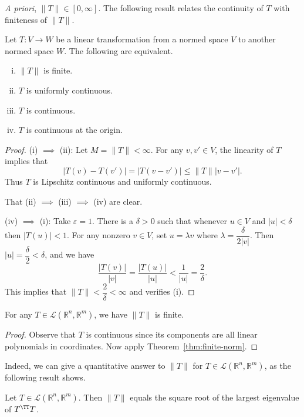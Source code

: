 \documentclass[11pt]{article}
\begin{document}
\textit{A priori}, $\| T \| \in [0, \infty]$.
The following result relates the continuity of $T$ with finiteness of $\| T \|$.

\begin{thm}
  \label{thm:finite-norm}
  Let $T : V \to W$ be a linear transformation from a normed space $V$ to another normed space $W$.
  The following are equivalent.
  \begin{enumerate}[(i)]
    \item $\| T \|$ is finite.
    \item $T$ is uniformly continuous.
    \item $T$ is continuous.
    \item $T$ is continuous at the origin.
  \end{enumerate}
\end{thm}

\begin{proof}
  (i) $\implies$ (ii): Let $M = \| T \| < \infty$.
  For any $v, v' \in V$, the linearity of $T$ implies that
  \[
    | T(v) - T(v') | = | T (v-v') | \leqslant \| T \| |v - v'|.
  \]
  Thus $T$ is Lipschitz continuous and uniformly continuous.

  That (ii) $\implies$ (iii) $\implies$ (iv) are clear.

  (iv) $\implies$ (i): Take $\varepsilon = 1$.
  There is a $\delta > 0$ such that whenever $u \in V$ and $|u| < \delta$ then $|T(u)| < 1$.
  For any nonzero $v \in V$, set $u = \lambda v$ where $\lambda = \dfrac{\delta}{2 |v|}$.
  Then $|u| = \dfrac{\delta}{2} < \delta$, and we have
  \[
    \frac{ |T(v)| }{ |v| } = \frac{ |T(u)| }{ |u| } < \frac{1}{|u|} = \frac{2}{\delta}.
  \]
  This implies that $\| T \| < \dfrac{2}{\delta} < \infty$ and verifies (i).
\end{proof}

\begin{cor}
  For any $T \in \mathcal{L}(\mathbb{R}^n, \mathbb{R}^m)$, we have $\| T \|$ is finite.
\end{cor}

\begin{proof}
  Observe that $T$ is continuous since its components are all linear polynomials in coordinates.
  Now apply Theorem~\ref{thm:finite-norm}.
\end{proof}

Indeed, we can give a quantitative answer to $\| T \|$ for $T \in \mathcal{L}(\mathbb{R}^n, \mathbb{R}^m)$, as the following result shows.

\begin{thm}
  Let $T \in \mathcal{L}(\mathbb{R}^n, \mathbb{R}^m)$.
  Then $\| T \|$ equals the square root of the largest eigenvalue of $T^\TT T$.
\end{thm}
\end{document}
